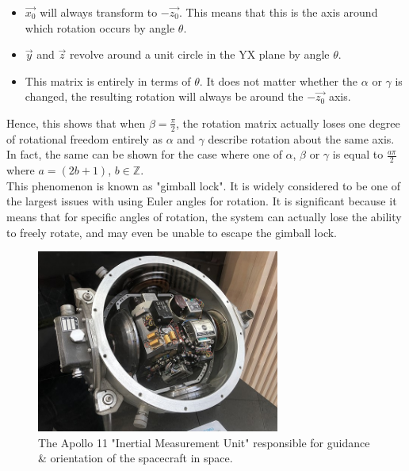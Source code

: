 \documentclass[12pt, a4paper]{article}
\begin{document}
\begin{itemize}[leftmargin=2cm]
    \item $\vec{x_0}$ will always transform to $-\vec{z_0}$. This means that
    this is the axis around which rotation occurs by angle $\theta$.
    \item $\vec{y}$ and $\vec{z}$ revolve around a unit circle in the YX plane
    by angle $\theta$.
    \item This matrix is entirely in terms of $\theta$. It does not matter
    whether the $\alpha$ or $\gamma$ is changed, the resulting rotation will always
    be around the $-\vec{z_0}$ axis.
\end{itemize}

Hence, this shows that when $\beta = \frac{\pi}{2}$, the rotation matrix
actually loses one degree of rotational freedom entirely as $\alpha$ and
$\gamma$ describe rotation about the same axis. In fact, the same can be shown
for the case where one of $\alpha$, $\beta$ or $\gamma$ is equal to
$\frac{a\pi}{2}$ where $a = (2b+1)$, $b \in \mathbb{Z}$. \\

This phenomenon is known as "gimball lock". It is widely considered to be one of
the largest issues with using Euler angles for rotation. It is significant
because it means that for specific angles of rotation, the system can actually
lose the ability to freely rotate, and may even be unable to escape the gimball
lock. \\

\pagebreak

\begin{figure}[H]
    \includegraphics[width=8cm]{res/apollo_imu.jpg}
    \centering
    \caption{The Apollo 11 "Inertial Measurement Unit" responsible for guidance \& orientation of the spacecraft in space.}
\end{figure}
\end{document}
